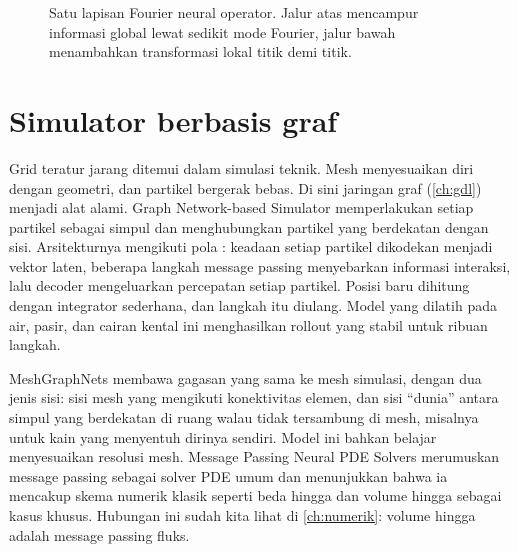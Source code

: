 \begin{figure}[ht]
\centering
{}
\caption{Satu lapisan Fourier neural operator. Jalur atas mencampur informasi global lewat sedikit mode Fourier,
jalur bawah menambahkan transformasi lokal titik demi titik.}
\label{fig:fno}
\end{figure}

\section{Simulator berbasis graf}

Grid teratur jarang ditemui dalam simulasi teknik. Mesh menyesuaikan diri dengan geometri, dan partikel
bergerak bebas. Di sini jaringan graf (\cref{ch:gdl}) menjadi alat alami. Graph Network-based Simulator
\citep{sanchez2020} memperlakukan setiap partikel sebagai simpul dan menghubungkan partikel yang
berdekatan dengan sisi. Arsitekturnya mengikuti pola : keadaan setiap
partikel dikodekan menjadi vektor laten, beberapa langkah message passing menyebarkan informasi
interaksi, lalu decoder mengeluarkan percepatan setiap partikel. Posisi baru dihitung dengan integrator
sederhana, dan langkah itu diulang. Model yang dilatih pada air, pasir, dan cairan kental ini
menghasilkan rollout yang stabil untuk ribuan langkah.

MeshGraphNets \citep{pfaff2021} membawa gagasan yang sama ke mesh simulasi, dengan dua jenis sisi:
sisi mesh yang mengikuti konektivitas elemen, dan sisi ``dunia'' antara simpul yang berdekatan di ruang
walau tidak tersambung di mesh, misalnya untuk kain yang menyentuh dirinya sendiri. Model ini bahkan
belajar menyesuaikan resolusi mesh. Message Passing Neural PDE Solvers \citep{brandstetter2022} merumuskan
message passing sebagai solver PDE umum dan menunjukkan bahwa ia mencakup skema numerik klasik seperti
beda hingga dan volume hingga sebagai kasus khusus. Hubungan ini sudah kita lihat di \cref{ch:numerik}:
volume hingga adalah message passing fluks.

